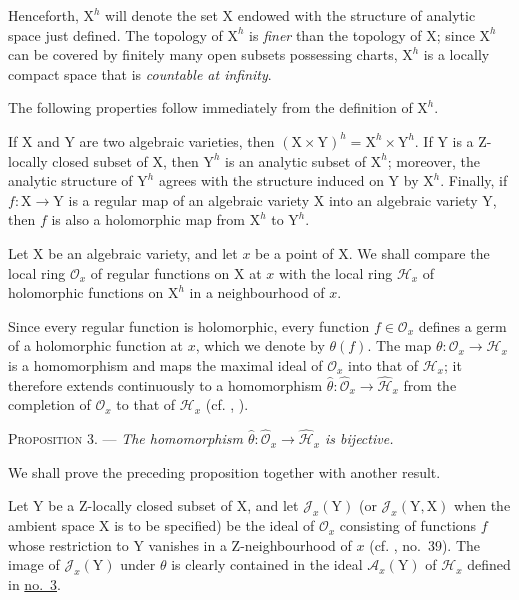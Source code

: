 Henceforth, $\mathrm{X}^h$ will denote the set $\mathrm{X}$ endowed with the structure of analytic space just defined. The topology of $\mathrm{X}^h$ is \emph{finer} than the topology of $\mathrm{X}$; since $\mathrm{X}^h$ can be covered by finitely many open subsets possessing charts, $\mathrm{X}^h$ is a locally compact space that is \emph{countable at infinity}.

The following properties follow immediately from the definition of $\mathrm{X}^h$.

If $\mathrm{X}$ and $\mathrm{Y}$ are two algebraic varieties, then $(\mathrm{X}\times\mathrm{Y})^h=\mathrm{X}^h\times\mathrm{Y}^h$. If $\mathrm{Y}$ is a Z-locally closed subset of $\mathrm{X}$, then $\mathrm{Y}^h$ is an analytic subset of $\mathrm{X}^h$; moreover, the analytic structure of $\mathrm{Y}^h$ agrees with the structure induced on $\mathrm{Y}$ by $\mathrm{X}^h$. Finally, if $f:\mathrm{X}\to\mathrm{Y}$ is a regular map of an algebraic variety $\mathrm{X}$ into an algebraic variety $\mathrm{Y}$, then $f$ is also a holomorphic map from $\mathrm{X}^h$ to $\mathrm{Y}^h$.


Let $\mathrm{X}$ be an algebraic variety, and let $x$ be a point of $\mathrm{X}$. We shall compare the local ring $\mathcal{O}_x$ of regular functions on $\mathrm{X}$ at $x$ with the local ring $\mathcal{H}_x$ of holomorphic functions on $\mathrm{X}^h$ in a neighbourhood of $x$.

Since every regular function is holomorphic, every function $f\in\mathcal{O}_x$ defines a germ of a holomorphic function at $x$, which we denote by $\theta(f)$. The map $\theta:\mathcal{O}_x\to\mathcal{H}_x$ is a homomorphism and maps the maximal ideal of $\mathcal{O}_x$ into that of $\mathcal{H}_x$; it therefore extends continuously to a homomorphism $\hat\theta:\hat{\mathcal{O}}_x\to\hat{\mathcal{H}}_x$ from the completion of $\mathcal{O}_x$ to that of $\mathcal{H}_x$ (cf. , ).

\textsc{Proposition 3}. --- \emph{The homomorphism $\hat\theta:\hat{\mathcal{O}}_x\to\hat{\mathcal{H}}_x$ is bijective.}

We shall prove the preceding proposition together with another result.

Let $\mathrm{Y}$ be a Z-locally closed subset of $\mathrm{X}$, and let $\mathcal{J}_x(\mathrm{Y})$ (or $\mathcal{J}_x(\mathrm{Y},\mathrm{X})$ when the ambient space $\mathrm{X}$ is to be specified) be the ideal of $\mathcal{O}_x$ consisting of functions $f$ whose restriction to $\mathrm{Y}$ vanishes in a Z-neighbourhood of $x$ (cf. , no.~39). The image of $\mathcal{J}_x(\mathrm{Y})$ under $\theta$ is clearly contained in the ideal $\mathcal{A}_x(\mathrm{Y})$ of $\mathcal{H}_x$ defined in \hyperref[gaga:no:3]{no.~3}.

